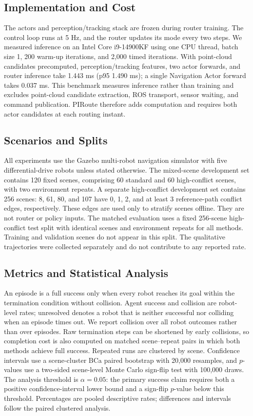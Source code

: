 \documentclass[letterpaper,10pt,conference]{ieeeconf}
\newcommand{\method}{PIRoute}
\begin{document}
\subsection{Implementation and Cost}
The actors and perception/tracking stack are frozen during router training. The control loop runs at 5 Hz, and the router updates its mode every two steps. We measured inference on an Intel Core i9-14900KF using one CPU thread, batch size 1, 200 warm-up iterations, and 2,000 timed iterations. With point-cloud candidates precomputed, perception/tracking features, two actor forwards, and router inference take 1.443 ms (p95 1.490 ms); a single Navigation Actor forward takes 0.037 ms. This benchmark measures inference rather than training and excludes point-cloud candidate extraction, ROS transport, sensor waiting, and command publication. \method{} therefore adds computation and requires both actor candidates at each routing instant.

\subsection{Scenarios and Splits}
All experiments use the Gazebo multi-robot navigation simulator with five differential-drive robots unless stated otherwise. The mixed-scene development set contains 120 fixed scenes, comprising 60 standard and 60 high-conflict scenes, with two environment repeats. A separate high-conflict development set contains 256 scenes: 8, 61, 80, and 107 have 0, 1, 2, and at least 3 reference-path conflict edges, respectively. These edges are used only to stratify scenes offline. They are not router or policy inputs. The matched evaluation uses a fixed 256-scene high-conflict test split with identical scenes and environment repeats for all methods. Training and validation scenes do not appear in this split. The qualitative trajectories were collected separately and do not contribute to any reported rate.

\subsection{Metrics and Statistical Analysis}
An episode is a full success only when every robot reaches its goal within the termination condition without collision. Agent success and collision are robot-level rates; unresolved denotes a robot that is neither successful nor colliding when an episode times out. We report collision over all robot outcomes rather than over episodes. Raw termination steps can be shortened by early collisions, so completion cost is also computed on matched scene--repeat pairs in which both methods achieve full success. Repeated runs are clustered by scene. Confidence intervals use a scene-cluster BCa paired bootstrap with 20,000 resamples, and $p$-values use a two-sided scene-level Monte Carlo sign-flip test with 100,000 draws. The analysis threshold is $\alpha=0.05$: the primary success claim requires both a positive confidence-interval lower bound and a sign-flip $p$-value below this threshold. Percentages are pooled descriptive rates; differences and intervals follow the paired clustered analysis.
\end{document}
